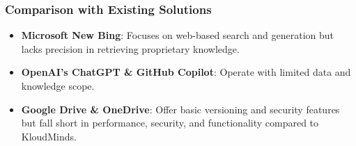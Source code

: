 \documentclass{beamer}
\begin{document}
\begin{frame}
\frametitle{Comparison with Existing Solutions}
\begin{itemize}
    \item \textbf{Microsoft New Bing}: Focuses on web-based search and generation but lacks precision in retrieving proprietary knowledge.
    \item \textbf{OpenAI's ChatGPT \& GitHub Copilot}: Operate with limited data and knowledge scope.
    \item \textbf{Google Drive \& OneDrive}: Offer basic versioning and security features but fall short in performance, security, and functionality compared to KloudMinds.
\end{itemize}
\end{frame}



\end{document}
